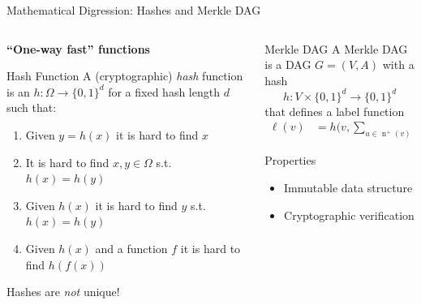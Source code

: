 \documentclass[xetex, handout]{beamer}
\begin{document}
\begin{frame}{Mathematical Digression: Hashes and Merkle DAG}
  \begin{columns}
    \begin{column}{.5\linewidth}
      \textbf{``One-way fast'' functions}
      \begin{block}{Hash Function}
        A (cryptographic) \emph{hash} function is an $h : \Omega \to \{0,1\}^d$
        for a fixed hash length $d$ such that:
        \begin{enumerate}
          \item Given $y = h(x)$ it is hard to find $x$
          \item It is hard to find $x,y \in \Omega$ s.t. $h(x) = h(y)$
          \item Given $h(x)$ it is hard to find $y$ s.t. $h(x) = h(y)$
          \item Given $h(x)$ and a function $f$ it is hard to find $h(f(x))$
        \end{enumerate}
      \end{block}
      Hashes are \emph{not} unique!
    \end{column}
    \begin{column}{.5\linewidth}
      \begin{block}{Merkle DAG}
        A Merkle DAG is a DAG $G = (V,A)$ with a hash
        \[
          h : V \times \{0,1\}^d \to \{0,1\}^d
        \]
        that defines a label function
        \begin{align*}
          \ell(v) &= h\biggl(v,
            \sum_{u \in \operatorname{n}^+(v)} \ell(u) \biggr)
        \end{align*}
      \end{block}
      \begin{alertblock}{Properties}
        \begin{itemize}
          \item Immutable data structure
          \item Cryptographic verification
        \end{itemize}
      \end{alertblock}
    \end{column}
  \end{columns}
\end{frame}
\end{document}
